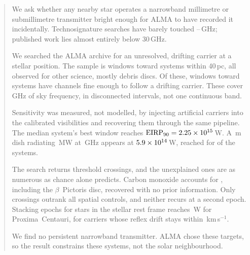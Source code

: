 \begin{abstract}
We ask whether any nearby star operates a narrowband millimetre or
submillimetre transmitter bright enough for ALMA to have recorded it
incidentally. Technosignature searches have barely touched
\SurvFreqLo--\SurvFreqHi\,GHz; published work lies almost entirely below
30\,GHz.

We searched the ALMA archive for an unresolved, drifting carrier
at a stellar position. The sample is \NWindows{} windows toward
\NSystems{} systems within 40\,pc, all observed for other science,
mostly debris discs. Of these, \NWinA{} windows toward
\NSysClassA{} systems have channels fine enough to follow a drifting
carrier. These cover \UnionClassA\,GHz of sky frequency, in disconnected
intervals, not one continuous band.

Sensitivity was measured, not modelled, by injecting artificial carriers
into the calibrated visibilities and recovering them through the same
pipeline. The median system's best window reaches
$\mathrm{EIRP}_{90} = \EirpNinetySysMedA$\,W. A \BenchDiam\,m dish
radiating \BenchPowerMW\,MW at \BenchFreqGHz\,GHz appears at
$\BenchEirp$\,W, reached for \BenchNSysA{} of the \NSysClassA{} systems.

The search returns \NCross{} threshold crossings, and the unexplained
ones are as numerous as chance alone predicts. Carbon monoxide accounts
for \NAttributed{}, including the $\beta$~Pictoris disc, recovered with
no prior information. Only \NUnattrRankFlagged{} crossings outrank all
\NCtrl{} spatial controls, and neither recurs at a second epoch.
Stacking epochs for \StkNStar{} stars in the stellar rest frame reaches
\StkProxEirpCalMath\,W for Proxima~Centauri, for carriers whose reflex drift
stays within \StkProxTolKms\,km\,s$^{-1}$.

We find no persistent narrowband transmitter. ALMA chose these targets,
so the result constrains these \NSystems{} systems, not the solar
neighbourhood.
\end{abstract}


